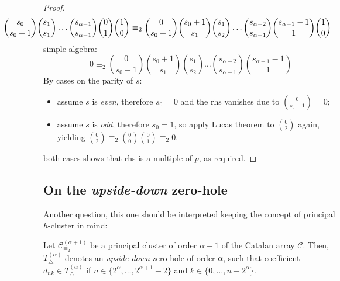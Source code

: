 \begin{proof}
    \begin{displaymath}
        \hspace{-2cm}
        {{s_{0}}\choose{s_{0}+1}}
        {{s_{1}}\choose{s_{1}}}
        \ldots
        {{s_{\alpha-1}}\choose{s_{\alpha-1}}}
        {{0}\choose{1}}
        {{1}\choose{0}}
        \equiv_{2}
        {{0}\choose{s_{0}+1}}
        {{s_{0}+1}\choose{s_{1}}}
        {{s_{1}}\choose{s_{2}}}
        \ldots
        {{s_{\alpha-2}}\choose{s_{\alpha-1}}}
        {{s_{\alpha-1}-1}\choose{1}}
        {{1}\choose{0}}
    \end{displaymath}
    simple algebra:
    \begin{displaymath}
        0
        \equiv_{2}
        {{0}\choose{s_{0}+1}}
        {{s_{0}+1}\choose{s_{1}}}
        {{s_{1}}\choose{s_{2}}}
        \ldots
        {{s_{\alpha-2}}\choose{s_{\alpha-1}}}
        {{s_{\alpha-1}-1}\choose{1}}
    \end{displaymath}
    By cases on the parity of $s$:
    \begin{itemize}
        \item assume $s$ is \emph{even}, therefore $s_{0}=0$ and the \ac{rhs} vanishes due to ${{0}\choose{s_{0}+1}}=0$;
        \item assume $s$ is \emph{odd}, therefore $s_{0}=1$, so apply Lucas theorem to ${{0}\choose{2}}$ again,
            yielding ${{0}\choose{2}}\equiv_{2}{{0}\choose{0}}{{0}\choose{1}}\equiv_{2}0$.
    \end{itemize}
    both cases shows that \ac{rhs} is a multiple of $p$, as required.
\end{proof}

\subsection{On the \emph{upside-down} zero-hole}

Another question, this one should be interpreted keeping the
concept of principal $h$-cluster in mind:
\begin{theorem}
    Let $\mathcal{C}_{\equiv_{2}}^{(\alpha+1)}$ be a principal cluster 
    of order $\alpha+1$ of the Catalan array $\mathcal{C}$. Then, 
    $T_{\bigtriangleup}^{({\alpha})}$ denotes an \emph{upside-down} zero-hole of order $\alpha$,
    such that coefficient $d_{nk}\in T_{\bigtriangleup}^{({\alpha})}$ if 
    $n\in\lbrace 2^{{\alpha}},\ldots,2^{{\alpha}+1}-2\rbrace$ and 
    $k\in\lbrace 0,\ldots, n-2^{{\alpha}}\rbrace$. \end{theorem}

